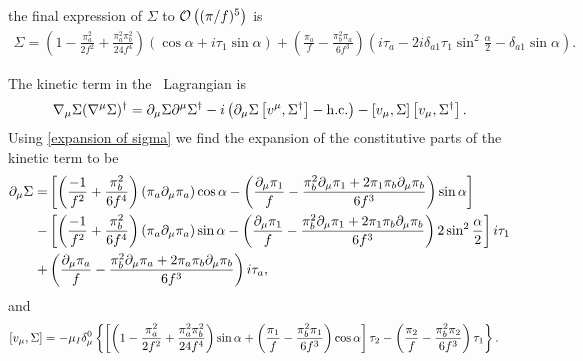 the final expression of $\Sigma$ to $\Oh[5]{(\pi/f)}$ is
\begin{align}
    \Sigma =
     \left(
        1 
        - \frac{\pi_a^2}{2f^2}
        + \frac{\pi_a^2\pi_b^2}{24f^4}
    \right)
    (\cos{\alpha} + i \tau_1 \sin{\alpha})
    +
    \left(
        \frac{\pi_a}{f} 
        - \frac{\pi_b^2\pi_a}{6f^3} 
    \right)
    \left(
        i\tau_a - 2i \delta_{a1}\tau_1\sin^2{\frac{\alpha}{2}} - \delta_{a1} \sin{\alpha}
    \right).
    \label{expansion of sigma}
\end{align}
%

The kinetic term in the \chpt\, Lagrangian is
\begin{equation}
    \nabla_\mu \Sigma (\nabla^\mu \Sigma)^\dagger 
    = \partial_\mu \Sigma \partial^\mu \Sigma^\dagger 
    - i \left(\partial_\mu \Sigma \com{v^\mu}{\Sigma^\dagger} - \hc \right)
    - \com{v_\mu}{\Sigma}\com{v_\mu}{\Sigma^\dagger}.
    \label{kinetic term}
\end{equation}
%
Using \cref{expansion of sigma} we find the expansion of the constitutive parts of the kinetic term to be
\begin{align}
    \notag
    \partial_\mu \Sigma 
    = &
    \left[
        \left(
            \frac{-1}{f^2}
            + \frac{\pi_b^2}{6f^4}
        \right)
        (\pi_a \partial_\mu \pi_a)
        \cos{\alpha}
        - 
        \left(
            \frac{\partial_\mu \pi_1}{f} 
            - \frac{\pi_b^2 \partial_\mu\pi_1
            + 2 \pi_1 \pi_b \partial_\mu\pi_b}{6f^3} 
        \right)
        \sin{\alpha}
    \right]
    \\ \notag 
    - &
    \left[
        \left(
            \frac{-1}{f^2}
            + \frac{\pi_b^2}{6f^4}
        \right)
        (\pi_a \partial_\mu \pi_a)
        \sin{\alpha}
        - \left(
        \frac{\partial_\mu \pi_1}{f} 
        - \frac{\pi_b^2 \partial_\mu\pi_1
        + 2 \pi_1 \pi_b \partial_\mu\pi_b}{6f^3}
        \right)
        2 \sin^2{\frac{\alpha}{2}}
    \right]
    i \tau_1 \\ \label{Sigma derivative}
    +& 
    \left(
        \frac{\partial_\mu \pi_a}{f} 
        - \frac{\pi_b^2 \partial_\mu\pi_a 
        + 2 \pi_a \pi_b \partial_\mu\pi_b}{6f^3} 
    \right)
    i \tau_a,
\end{align}
%
and
\begin{align}
    \com{v_\mu}{\Sigma} 
    & =
    -\mu_I \delta^0_\mu
    \left\{
        \left[
        \left(
            1 
            - \frac{\pi_a^2}{2f^2}
            + \frac{\pi_a^2\pi_b^2}{24f^4}
        \right)
        \sin{\alpha}
        + 
        \left(
            \frac{\pi_1}{f} 
            - \frac{\pi_b^2\pi_1}{6f^3} 
        \right) \cos{\alpha}
        \right]
         \tau_2
        -
        \left(
            \frac{\pi_2}{f} 
            - \frac{\pi_b^2\pi_2}{6f^3} 
        \right)
        \tau_1
    \right\}.
    \label{sigma commutator}
\end{align}
